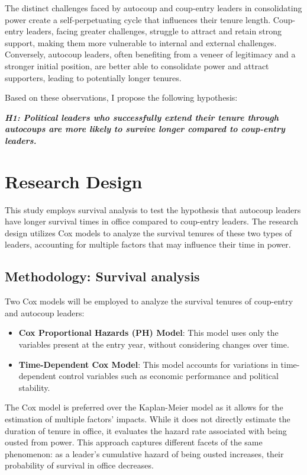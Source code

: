 \documentclass[
  12pt,
]{report}
\begin{document}
The distinct challenges faced by autocoup and coup-entry leaders in
consolidating power create a self-perpetuating cycle that influences
their tenure length. Coup-entry leaders, facing greater challenges,
struggle to attract and retain strong support, making them more
vulnerable to internal and external challenges. Conversely, autocoup
leaders, often benefiting from a veneer of legitimacy and a stronger
initial position, are better able to consolidate power and attract
supporters, leading to potentially longer tenures.

Based on these observations, I propose the following hypothesis:

\textbf{\emph{H1: Political leaders who successfully extend their tenure
through autocoups are more likely to survive longer compared to
coup-entry leaders.}}

\section{Research Design}\label{research-design-1}

This study employs survival analysis to test the hypothesis that
autocoup leaders have longer survival times in office compared to
coup-entry leaders. The research design utilizes Cox models to analyze
the survival tenures of these two types of leaders, accounting for
multiple factors that may influence their time in power.

\subsection{Methodology: Survival
analysis}\label{methodology-survival-analysis}

Two Cox models will be employed to analyze the survival tenures of
coup-entry and autocoup leaders:

\begin{itemize}
\item
  \textbf{Cox Proportional Hazards (PH) Model}: This model uses only the
  variables present at the entry year, without considering changes over
  time.
\item
  \textbf{Time-Dependent Cox Model}: This model accounts for variations
  in time-dependent control variables such as economic performance and
  political stability.
\end{itemize}

The Cox model is preferred over the Kaplan-Meier model as it allows for
the estimation of multiple factors' impacts. While it does not directly
estimate the duration of tenure in office, it evaluates the hazard rate
associated with being ousted from power. This approach captures
different facets of the same phenomenon: as a leader's cumulative hazard
of being ousted increases, their probability of survival in office
decreases.
\end{document}
